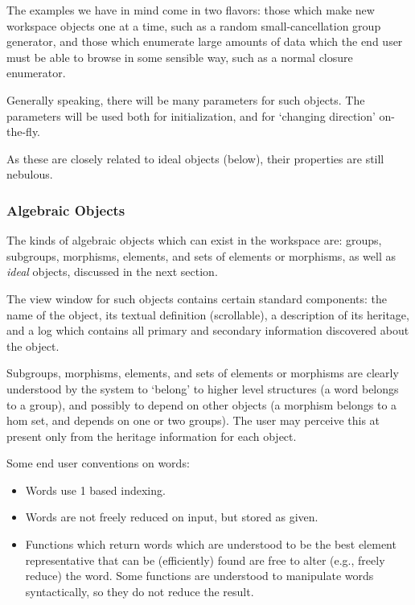
The examples we have in mind come in two flavors: those which make new
workspace objects one at a time, such as a random small-cancellation
group generator, and those which enumerate large amounts of data which
the end user must be able to browse in some sensible way, such as a
normal closure enumerator.

Generally speaking, there will be many parameters for such
objects. The parameters will be used both for initialization, and for
`changing direction' on-the-fly.

As these are closely related to ideal objects (below), their
properties are still nebulous.


\subsubsection{Algebraic Objects}

The kinds of algebraic objects which can exist in the workspace
are: groups, subgroups, morphisms, elements, and sets of elements or
morphisms, as well as {\em ideal} objects, discussed in the next
section.

The view window for such objects contains certain standard
components: the name of the object, its textual definition
(scrollable), a description of its heritage, and a log which contains
all primary and secondary information discovered about the object.

Subgroups, morphisms, elements, and sets of elements or morphisms are
clearly understood by the system to `belong' to higher level
structures (a word belongs to a group), and possibly to depend on
other objects (a morphism belongs to a hom set, and depends on one or
two groups). The user may perceive this at present only from the
heritage information for each object.

Some end user conventions on words:

\begin{itemize}

\item
Words use 1 based indexing.

\item
Words are not freely reduced on input, but stored as given.

\item
Functions which return words which are understood to be the best
element representative that can be (efficiently) found are free to
alter (e.g., freely reduce) the word. Some functions are understood to
manipulate words syntactically, so they do not reduce the result.

\end{itemize}



